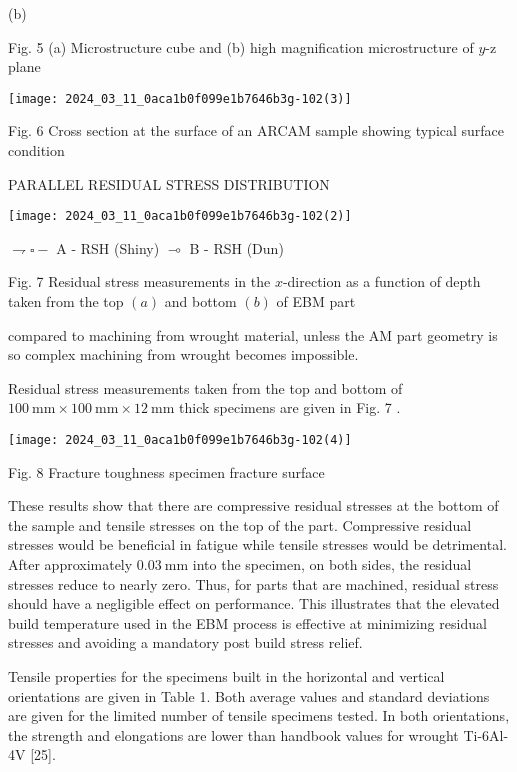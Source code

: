 \documentclass[10pt]{article}
\begin{document}
(b)

Fig. 5 (a) Microstructure cube and (b) high magnification microstructure of $y$-z plane

\begin{center}
\texttt{[image: 2024\_03\_11\_0aca1b0f099e1b7646b3g-102(3)]}
\end{center}

Fig. 6 Cross section at the surface of an ARCAM sample showing typical surface condition

PARALLEL RESIDUAL STRESS DISTRIBUTION

\begin{center}
\texttt{[image: 2024\_03\_11\_0aca1b0f099e1b7646b3g-102(2)]}
\end{center}

$\rightharpoondown \square-$ A - RSH (Shiny) $\multimap$ B - RSH (Dun)

Fig. 7 Residual stress measurements in the $x$-direction as a function of depth taken from the top $(a)$ and bottom $(b)$ of EBM part

compared to machining from wrought material, unless the AM part geometry is so complex machining from wrought becomes impossible.

Residual stress measurements taken from the top and bottom of $100 \mathrm{~mm} \times 100 \mathrm{~mm} \times 12 \mathrm{~mm}$ thick specimens are given in Fig. 7 .

\begin{center}
\texttt{[image: 2024\_03\_11\_0aca1b0f099e1b7646b3g-102(4)]}
\end{center}

Fig. 8 Fracture toughness specimen fracture surface

These results show that there are compressive residual stresses at the bottom of the sample and tensile stresses on the top of the part. Compressive residual stresses would be beneficial in fatigue while tensile stresses would be detrimental. After approximately $0.03 \mathrm{~mm}$ into the specimen, on both sides, the residual stresses reduce to nearly zero. Thus, for parts that are machined, residual stress should have a negligible effect on performance. This illustrates that the elevated build temperature used in the EBM process is effective at minimizing residual stresses and avoiding a mandatory post build stress relief.

Tensile properties for the specimens built in the horizontal and vertical orientations are given in Table 1. Both average values and standard deviations are given for the limited number of tensile specimens tested. In both orientations, the strength and elongations are lower than handbook values for wrought Ti-6Al-4V [25].
\end{document}
